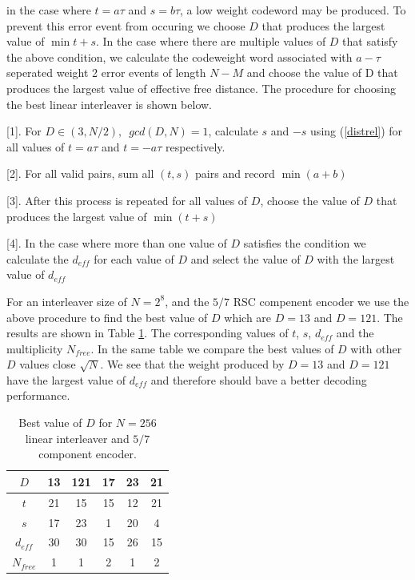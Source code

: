 \documentclass[a4paper, 12pt, oneside, openary]{jbook}
\begin{document}
in the case where $t=a\tau$ and $s=b\tau$, a low weight codeword may be produced. To prevent this error event from occuring we choose $D$ that produces the largest value of $\min t+s$. In the case where there are multiple values of $D$ that satisfy the above condition, we calculate the codeweight word associated with $a-\tau$ seperated weight 2 error events of length $N-M$ and choose the value of D that produces the largest value of effective free distance. 
The procedure for choosing the best linear interleaver is shown below.

[1]. For $D \in (3,N/2), \,\,\, gcd(D,N)=1$, calculate $s$ and  $-s$ using (\ref{distrel}) for all values of $t=a\tau$ and  $t=-a\tau$ respectively.

[2]. For all valid pairs, sum all $(t,s)$ pairs and record $\min (a+b)$

[3]. After this process is repeated for all values of $D$, choose the value of $D$ that produces the largest value of $\min (t+s)$

[4]. In the case where more than one value of $ D$ satisfies the condition we calculate the $d_{eff}$ for each value of $D$ and select the value of $D$ with the largest  value of $d_{eff}$

For an interleaver size of $N=2^8$, and the $5/7$ RSC compenent encoder we use the above procedure to find the best value of $D$ which are $D=13$ and $D=121$. The results are shown in Table \ref{tab1}. The corresponding values of $t$, $s$, $d_{eff}$ and the multiplicity $N_{free}$. In the same table we compare the best values of $D$ with other $D$ values close $\sqrt{N}$. We see that the weight produced by $D=13$ and $D=121$ have the largest value of $d_{eff}$ and therefore should bave a better decoding performance.

\begin{table}[h!]
\centering
\begin{tabular}{||c |c |c |c |c |c ||} 
 \hline
 $D$ & 13 & 121 & 17 & 23 & 21\\ [0.5ex] 
 \hline\hline
 $t $ & 21 & 15 & 15 & 12 & 21 \\ 
 \hline
  $s $ & 17 & 23 & 1 & 20 & 4 \\ 
  \hline
  $d_{eff} $ & 30 & 30 & 15 & 26 & 15 \\ 
  \hline
  $N_{free}$ & 1 & 1 & 2 & 1 & 2 \\ [1ex] 
 \hline
\end{tabular}
\caption{Best value of $D$ for $N=256$ linear interleaver
 and $5/7$ component encoder. }
\label{tab1}
\end{table}
\end{document}
